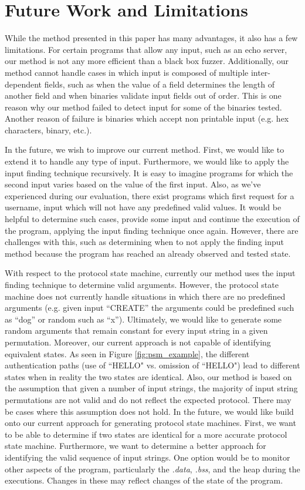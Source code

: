 \documentclass{acm_proc_article-sp}
\begin{document}
\section{Future Work and Limitations} \label{futurework}
While the method presented in this paper has many advantages, it also has a few limitations.
For certain programs that allow any input, such as an echo server, our method is not any more efficient than a black box fuzzer.
Additionally, our method cannot handle cases in which input is composed of multiple inter-dependent fields, such as when the value of a field determines the length of another field and when binaries validate input fields out of order.
This is one reason why our method failed to detect input for some of the binaries tested.
Another reason of failure is binaries which accept non printable input (e.g. hex characters, binary, etc.).

In the future, we wish to improve our current method.
First, we would like to extend it to handle any type of input.
Furthermore, we would like to apply the input finding technique recursively.
It is easy to imagine programs for which the second input varies based on the value of the first input.
Also, as we've experienced during our evaluation, there exist programs which first request for a username, input which will not have any predefined valid values.
It would be helpful to determine such cases, provide some input and continue the execution of the program, applying the input finding technique once again.
However, there are challenges with this, such as determining when to not apply the finding input method because the program has reached an already observed and tested state.

With respect to the protocol state machine, currently our method uses the input finding technique to determine valid arguments.
However, the protocol state machine does not currently handle situations in which there are no predefined arguments (e.g. given input ``CREATE'' the arguments could be predefined such as ``dog'' or random such as ``x'').
Ultimately, we would like to generate some random arguments that remain constant for every input string in a given permutation.
Moreover, our current approach is not capable of identifying equivalent states. As seen in Figure \ref{fig:psm_example}, the different authentication paths (use of ``HELLO" vs. omission of ``HELLO") lead to different states when in reality the two states are identical.
Also, our method is based on the assumption that given a number of input strings, the majority of input string permutations are not valid and do not reflect the expected protocol.
There may be cases where this assumption does not hold.
In the future, we would like build onto our current approach for generating protocol state machines. 
First, we want to be able to determine if two states are identical for a more accurate protocol state machine.
Furthermore, we want to determine a better approach for identifying the valid sequence of input strings.
One option would be to monitor other aspects of the program, particularly the \textit{.data}, \textit{.bss}, and the heap during the executions.
Changes in these may reflect changes of the state of the program.
\end{document}
